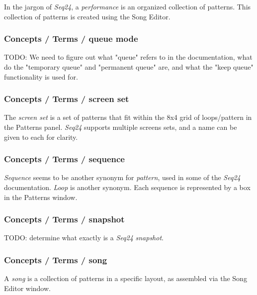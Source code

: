    In the jargon of \textsl{Seq24}, a
   \textsl{performance} is an organized collection of patterns.
   This collection of patterns is created using the Song Editor.

\subsubsection{Concepts / Terms / queue mode}
\label{subsubsec:concepts_terms_queue_mode}

   TODO:  
   We need to figure out what "queue" refers to in the documentation, what
   do the "temporary queue" and "permanent queue" are, and what the "keep
   queue" functionality is used for.

\subsubsection{Concepts / Terms / screen set}
\label{subsubsec:concepts_terms_screen_set}

   The \textsl{screen set}
   is a set of patterns that fit within the 8x4 grid of loops/pattern in the
   Patterns panel.
   \textsl{Seq24} supports multiple screens sets, and a name can be given to
   each for clarity.

\subsubsection{Concepts / Terms / sequence}
\label{subsubsec:concepts_terms_sequence}

   \textsl{Sequence} seems to be
   another synonym for \textsl{pattern}, used in some of the \textsl{Seq24}
   documentation.  \textsl{Loop} is another synonym.
   Each sequence is represented by a box in the Patterns window.

\subsubsection{Concepts / Terms / snapshot}
\label{subsubsec:concepts_terms_snapshot}

   TODO:    determine what exactly is a
   \textsl{Seq24}
   \textsl{snapshot}.

\subsubsection{Concepts / Terms / song}
\label{subsubsec:concepts_terms_song}

   A \textsl{song} is a collection of patterns in a specific layout, as
   assembled via the Song Editor window.

